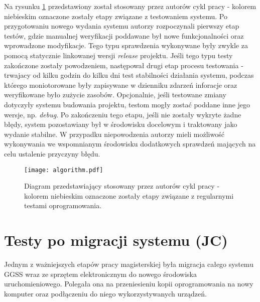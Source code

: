 \clearpage
Na rysunku \ref{fig:tests_1} przedstawiony został stosowany przez autorów cykl pracy - kolorem niebieskim oznaczone zostały etapy związane z testowaniem systemu. Po przygotowaniu nowego wydania systemu autorzy rozpoczynali pierwszy etap testów, gdzie manualnej weryfikacji poddawane był nowe funkcjonalności oraz wprowadzone modyfikacje. Tego typu sprawdzenia wykonywane były zwykle za pomocą statycznie linkowanej wersji \emph{release} projektu. Jeśli tego typu testy zakończone zostały powodzeniem, następował drugi etap procesu testowania - trwajacy od kilku godzin do kilku dni test stabilności działania systemu, podczas którego moniotorowane były zapisywane w dzienniku zdarzeń inforacje oraz weryfikowane było zużycie zasobów. Opcjonalnie, jeśli testowane zmiany dotyczyły systemu budowania projektu, testom mogły zostać poddane inne jego wersje, np. \emph{debug}. Po zakończeniu tego etapu, jeśli nie zostały wykryte żadne błędy, system pozostawiany był w środowisku docelowym i traktowany jako wydanie stabilne. W przypadku niepowodzenia autorzy mieli możliwość wykonywania we wspomnianym środowisku dodatkowych sprawdzeń mających na celu ustalenie przyczyny błędu.

\begin{figure}[H]
\centering
\texttt{[image: algorithm.pdf]}
\caption{Diagram przedstawiający stosowany przez autorów cykl pracy - kolorem niebieskim oznaczone zostały etapy związane z regularnymi testami oprogramowania.}
\label{fig:tests_1}
\end{figure}

\section{Testy po migracji systemu (JC)}

Jednym z ważniejszych etapów pracy magisterskiej była migracja całego systemu GGSS wraz ze sprzętem elektronicznym do nowego środowiska uruchomieniowego. Polegała ona na przeniesieniu kopii oprogramowania na nowy komputer oraz podłączeniu do niego wykorzystywanych urządzeń.

